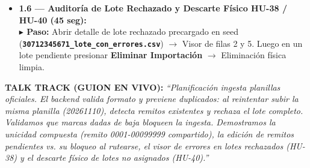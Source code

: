 \documentclass[a4paper,9pt]{article}
\newcommand{\stepact}[1]{\textbf{$\blacktriangleright$ Paso:} #1}
\newcommand{\codeb}[1]{\texttt{\bfseries #1}}
\begin{document}
\begin{tcolorbox}[cardframe, top=2.5pt, bottom=2.5pt]
{\begin{itemize}
\item \textbf{1.6 — Auditoría de Lote Rechazado y Descarte Físico HU-38 / HU-40 (45 seg):} \\
\stepact{Abrir detalle de lote rechazado precargado en seed (\codeb{30712345671\_lote\_con\_errores.csv}) $\rightarrow$ Visor de filas 2 y 5. Luego en un lote pendiente presionar \textbf{Eliminar Importación} $\rightarrow$ Eliminación física limpia.}
\end{itemize}
}
\vspace{-2pt}
\begin{tcolorbox}[talktrackcard]
{\scriptsize\textbf{TALK TRACK (GUION EN VIVO):}} {\scriptsize\itshape ``Planificación ingesta planillas oficiales. El backend valida formato y previene duplicados: al reintentar subir la misma planilla (20261110), detecta remitos existentes y rechaza el lote completo. Validamos que marcas dadas de baja bloqueen la ingesta. Demostramos la unicidad compuesta (remito 0001-00099999 compartido), la edición de remitos pendientes vs. su bloqueo al rutearse, el visor de errores en lotes rechazados (HU-38) y el descarte físico de lotes no asignados (HU-40).''}
\end{tcolorbox}
\end{tcolorbox}

\newpage

\end{document}
